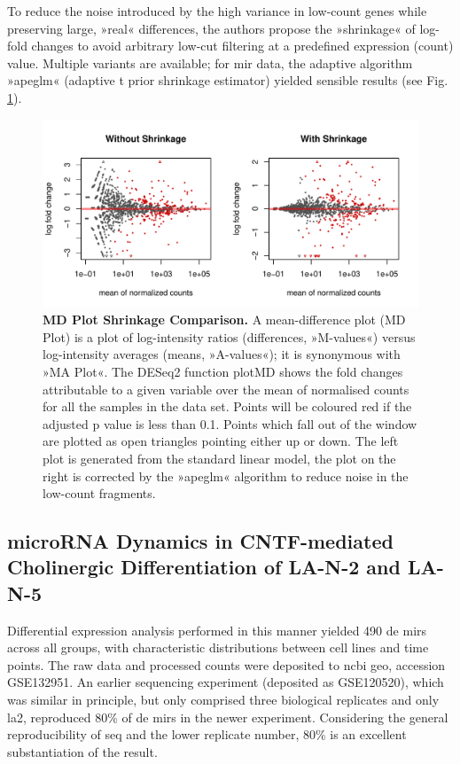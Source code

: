 To reduce the noise introduced by the high variance in low-count genes while preserving large, »real« differences, the authors propose the »shrinkage« of log-fold changes to avoid arbitrary low-cut filtering at a predefined expression (count) value. Multiple variants are available; for \ac{mir} data, the adaptive algorithm »apeglm«\cite{Zhu2019} (adaptive t prior shrinkage estimator) yielded sensible results (see Fig. \ref{fig:apeglm-comp-la2d4}).

\begin{figure}
\centering
\includegraphics[width=\textwidth]{figures/apeglm-comp-la2d4}
\caption[MD Plot Shrinkage Comparison.]{\textbf{MD Plot Shrinkage Comparison.} A mean-difference plot (MD Plot) is a plot of log-intensity ratios (differences, »M-values«) versus log-intensity averages (means, »A-values«); it is synonymous with »MA Plot«. The DESeq2 function plotMD shows the fold changes attributable to a given variable over the mean of normalised counts for all the samples in the data set. Points will be coloured red if the adjusted p value is less than 0.1. Points which fall out of the window are plotted as open triangles pointing either up or down. The left plot is generated from the standard linear model, the plot on the right is corrected by the »apeglm« algorithm\cite{Zhu2019} to reduce noise in the low-count fragments.
\label{fig:apeglm-comp-la2d4}}
\end{figure}

\subsection{microRNA Dynamics in CNTF-mediated Cholinergic Differentiation of LA-N-2 and LA-N-5}
Differential expression analysis performed in this manner yielded 490 \ac{de} \acp{mir} across all groups, with characteristic distributions between cell lines and time points. The raw data and processed counts were deposited to \ac{ncbi} \ac{geo}, accession GSE132951. An earlier sequencing experiment (deposited as GSE120520), which was similar in principle, but only comprised three biological replicates and only \ac{la2}, reproduced 80\% of \ac{de} \acp{mir} in the newer experiment. Considering the general reproducibility of \ac{seq} and the lower replicate number, 80\% is an excellent substantiation of the result.

